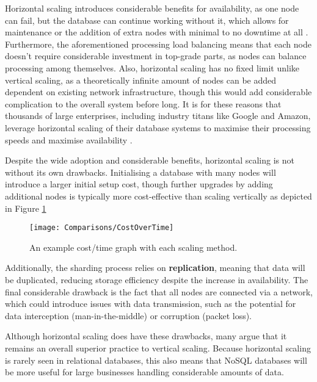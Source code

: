 \para Horizontal scaling introduces considerable benefits for availability, as one node can fail, but the database can continue working 
without it, which allows for maintenance or the addition of extra nodes with minimal to no downtime at all \autocite{mongodbGuideHorizontalVs}.
Furthermore, the aforementioned processing load balancing means that each node doesn't require considerable investment in 
top-grade parts, as nodes can balance processing among themselves. Also, horizontal scaling has no fixed limit unlike vertical scaling, as 
a theoretically infinite amount of nodes can be added dependent on existing network infrastructure, though this would add considerable 
complication to the overall system before long. It is for these reasons that thousands of large enterprises,
including industry titans like Google and Amazon, leverage horizontal scaling of their database systems to maximise their processing speeds
and maximise availability \autocite{changBigtableDistributedStorage2008,amazonModernizingAmazonDatabase2021}. 

\para Despite the wide adoption and considerable benefits, horizontal scaling is not without its own drawbacks. 
Initialising a database with many nodes will introduce a larger initial setup cost, though further upgrades by adding additional nodes 
is typically more cost-effective than scaling vertically as depicted in Figure \ref{fig:ScalingCostOverTime}

\begin{figure}[H]
    \centering
    \texttt{[image: Comparisons/CostOverTime]}
    \caption{An example cost/time graph with each scaling method. \autocite{mongodbGuideHorizontalVs}\label{fig:ScalingCostOverTime}}
\end{figure}


\noindent Additionally, the sharding process relies on \textbf{replication}, meaning that data will be duplicated, reducing storage efficiency
despite the increase in availability. The final considerable drawback is the fact that all nodes are connected via a network, which could 
introduce issues with data transmission, such as the potential for data interception (man-in-the-middle) or corruption (packet loss).

\para Although horizontal scaling does have these drawbacks, many argue that it remains an overall superior practice to vertical scaling. 
Because horizontal scaling is rarely seen in relational databases, this also means that NoSQL databases will be more useful for large 
businesses handling considerable amounts of data.



